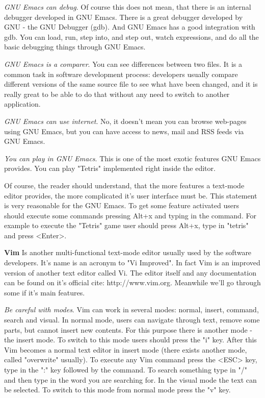 \textit {GNU Emacs can debug}. Of course this does not mean, that there is an internal debugger developed in GNU Emacs. There is a great debugger developed by GNU - the GNU Debugger (gdb). And GNU Emacs has a good integration with gdb. You can load, run, step into, and step out, watch expressions, and do all the basic debugging things through GNU Emacs.

\textit {GNU Emacs is a comparer}. You can see differences between two files. It is a common task in software development process: developers usually compare different versions of the same source file to see what have been changed, and it is really great to be able to do that without any need to switch to another application.

\textit {GNU Emacs can use internet}. No, it doesn't mean you can browse web-pages using GNU Emacs, but you can have access to news, mail and RSS feeds via GNU Emacs.

\textit {You can play in GNU Emacs}. This is one of the most exotic features GNU Emacs provides. You can play "Tetris" implemented right inside the editor.

Of course, the reader should understand, that the more features a text-mode editor provides, the more complicated it's user interface must be. This statement is very reasonable for the GNU Emacs. To get some feature activated users should execute some commands pressing Alt+x and typing in the command. For example to execute the "Tetris" game user should press Alt+x, type in "tetris" and press <Enter>.

\textbf{Vim} Is another multi-functional text-mode editor usually used by the software developers. It's name is an acronym to "Vi Improved". In fact Vim is an improved version of another text editor called Vi. The editor itself and any documentation can be found on it's official cite: http://www.vim.org. Meanwhile we'll go through some if it's main features.

\textit {Be careful with modes}. Vim can work in several modes: normal, insert, command, search and visual. In normal mode, users can navigate through text, remove some parts, but cannot insert new contents. For this purpose there is another mode - the insert mode. To switch to this mode users should press the "i" key. After this Vim becomes a normal text editor in insert mode (there exists another mode, called "overwrite" usually). To execute any Vim command press the <ESC> key, type in the ":" key followed by the command. To search something type in "/" and then type in the word you are searching for. In the visual mode the text can be selected. To switch to this mode from normal mode press the "v" key.

